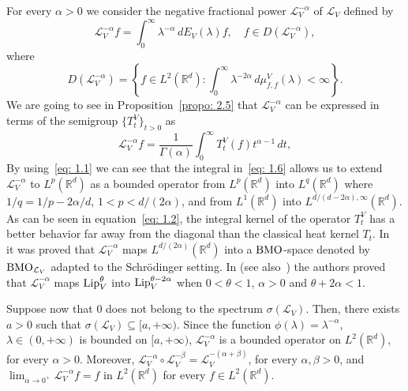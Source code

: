 \documentclass[10pt, a4paper, reqno]{amsart}
\theoremstyle{definition}
\theoremstyle{remark}
\newcommand{\Lip}{\textup{Lip}}
\numberwithin{equation}{section}
\begin{document}
For every $\alpha > 0$ we consider the negative fractional power $\mathcal{L}_V^{-\alpha}$ of $\mathcal{L}_V$ defined by
\begin{equation*}
    \mathcal{L}_V^{-\alpha} f = \int_0^\infty \lambda^{-\alpha} \, dE_V(\lambda) f, \quad f \in D(\mathcal{L}_V^{-\alpha}), 
\end{equation*}
where
\begin{equation*}
    D(\mathcal{L}_V^{-\alpha}) = \left\{ f \in L^2(\mathbb{R}^d) : \int_0^\infty \lambda^{-2\alpha} \, d\mu_{f,f}^V(\lambda) < \infty \right\}.
\end{equation*}
We are going to see in Proposition~\ref{propo: 2.5} that $\mathcal{L}_V^{-\alpha}$ can be expressed in terms of the semigroup $\{T_t^V\}_{t>0}$ as 
\begin{equation}\label{eq: 1.6}
    \mathcal{L}_V^{-\alpha} f = \frac{1}{\Gamma(\alpha)} \int_0^\infty T_t^V(f) t^{\alpha-1} \, dt,
\end{equation}
By using~\eqref{eq: 1.1} we can see that the integral in~\eqref{eq: 1.6} allows us to extend $\mathcal{L}_V^{-\alpha}$ to $L^p(\mathbb{R}^d)$ as a bounded operator from $L^p(\mathbb{R}^d)$ into $L^q(\mathbb{R}^d)$ where $1/q = 1/p - 2\alpha/d$, $1 < p < d/(2\alpha)$, and from $L^1(\mathbb{R}^d)$ into $L^{d/(d-2\alpha), \infty}(\mathbb{R}^d)$. As can be seen in equation~\eqref{eq: 1.2}, the integral kernel of the operator $T_t^V$ has a better behavior far away from the diagonal than the classical heat kernel $T_t$. In~\cite{DGMTZ} it was proved that $\mathcal{L}_V^{-\alpha}$ maps $L^{d/(2\alpha)}(\mathbb{R}^d)$ into a $\textup{BMO}$-space denoted by $\textup{BMO}_{\mathcal{L}_V}$ adapted to the Schr\"odinger setting. In \cite[Theorem 1.2]{MSTZ} (see also~\cite[Theorem 1.6]{dLT}) the authors proved that $\mathcal{L}_V^{-\alpha}$ maps $\Lip_V^\theta$ into $\Lip_V^{\theta - 2\alpha}$ when $0 < \theta < 1$, $\alpha > 0$ and $\theta + 2\alpha < 1$.

Suppose now that $0$ does not belong to the spectrum $\sigma(\mathcal{L}_V)$. Then, there exists $a > 0$ such that $\sigma(\mathcal{L}_V) \subseteq [a, +\infty)$. Since the function $\phi(\lambda) = \lambda^{-\alpha}$, $\lambda \in (0,+\infty)$ is bounded on $[a,+\infty)$, $\mathcal{L}_V^{-\alpha}$ is a bounded operator on $L^2(\mathbb{R}^d)$, for every $\alpha > 0$. Moreover, $\mathcal{L}_V^{-\alpha} \circ \mathcal{L}_V^{-\beta} = \mathcal{L}_V^{-(\alpha+\beta)}$, for every $\alpha, \beta > 0$, and $\lim_{\alpha \rightarrow 0^+} \mathcal{L}_V^{-\alpha} f = f$ in $L^2(\mathbb{R}^d)$ for every $f \in L^2(\mathbb{R}^d)$.
\end{document}
